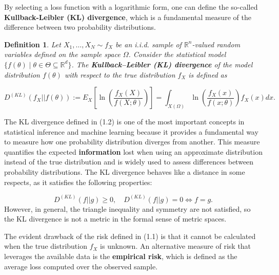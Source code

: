 \documentclass{report}
\newtheorem{definition}{Definition}[chapter]
\begin{document}
By selecting a loss function with a logarithmic form, one can define the so-called \textbf{Kullback-Leibler (KL) divergence}, which is a fundamental measure of the difference between two probability distributions.

\begin{definition}
Let $X_1,\dots,X_N \sim f_X$ be an i.i.d. sample of $\mathbb{R}^n$-valued random variables defined on the sample space $\Omega$. Consider the statistical model $\{f(\theta) \mid\theta\in\Theta\subseteq\mathbb{R}^d\}$. The \textbf{Kullback–Leibler (KL) divergence} of the model distribution $f(\theta)$ with respect to the true distribution $f_X$ is defined as

\begin{equation}
D^{(KL)}(f_X||f(\theta)) := E_X \left[\ln\left(\frac{f_X(X)}{f(X;\theta)}\right)\right] = \int_{X(\Omega)} \ln \left( \frac{f_X(x)}{f(x;\theta)}  \right)f_X(x)dx.
\end{equation}
\end{definition}
The KL divergence defined in (1.2) is one of the most important concepts in statistical inference and machine learning because it provides a fundamental way to measure how one probability distribution diverges from another. This measure quantifies the expected \textbf{information} lost when using an approximate distribution instead of the true distribution and is widely used to assess differences between probability distributions. The KL divergence behaves like a distance in some respects, as it satisfies the following properties:

\begin{equation}
D^{(KL)}(f||g) \geq 0, \quad D^{(KL)}(f||g) = 0 \iff f = g.
\end{equation}
However, in general, the triangle inequality and symmetry are not satisfied, so the KL divergence is not a metric in the formal sense of metric spaces.

The evident drawback of the risk defined in (1.1) is that it cannot be calculated when the true distribution $f_X$ is unknown. An alternative measure of risk that leverages the available data is the \textbf{empirical risk}, which is defined as the average loss computed over the observed sample.
\end{document}
